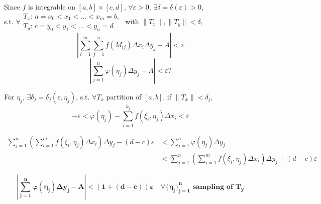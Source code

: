 \begin{pf}
    Since $f$ is integrable on $[a,b]\times[c,d]$, $\forall\varepsilon>0$, $\exists\delta=\delta(\varepsilon)>0$,\\
    s.t. $\forall\begin{matrix}
            T_x:\,a=x_0<x_1<\dots<x_m=b, \\
            T_y:\,c=y_0<y_1<\dots<y_n=d
        \end{matrix}$ with $\|T_x\|,\|T_y\|<\delta$,
    $$\left|\sum_{i=1}^m\sum_{j=1}^n f(M_{ij})\Delta x_i\Delta y_j-A\right|<\varepsilon$$
    $$\left|\sum_{j=1}^n\varphi(\eta_j)\Delta y_j-A\right|<\varepsilon?$$

    For $\eta_j$, $\exists\delta_j=\delta_j(\varepsilon,\eta_j)$, s.t. $\forall T_x$ partition of $[a,b]$, if $\|T_x\|<\delta_j$,
    $$-\varepsilon<\varphi(\eta_j)-\sum_{i=1}^{k_j}f(\xi_i,\eta_j)\Delta x_i<\varepsilon$$


    \begin{align*}
        \sum_{j=1}^n\left(\sum_{i=1}^mf(\xi_i,\eta_j)\Delta x_i\right)\Delta y_j-(d-c)\varepsilon
         & <\sum_{j=1}^n\varphi(\eta_j)\Delta y_j                                                      \\
         & <\sum_{j=1}^n\left(\sum_{i=1}^m f(\xi_i,\eta_j)\Delta x_i\right)\Delta y_j+(d-c)\varepsilon
    \end{align*}


    $$\boldsymbol{\left|\sum_{j=1}^n\varphi(\eta_j)\Delta y_j-A\right|<(1+(d-c))\varepsilon\quad\forall\{\eta_j\}_{j=1}^n\textbf{ sampling of }T_y}$$
\end{pf}


